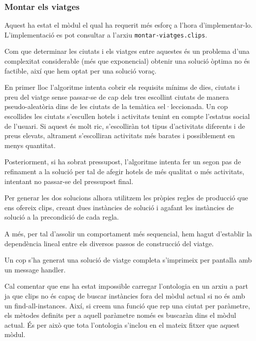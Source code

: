 \documentclass[11pt,a4paper]{article}
\begin{document}
\subsubsection*{Montar els viatges}

Aquest ha estat el mòdul el qual ha requerit més esforç a l'hora d'implementar-lo. L'implementació es pot consultar a l'arxiu \texttt{montar-viatges.clips}.

Com que determinar les ciutats i els viatges entre aquestes és un problema d'una complexitat considerable (més que exponencial) obtenir una solució òptima no és factible, així que hem optat per una solució voraç.

En primer lloc l'algoritme intenta cobrir els requisits mínims de dies, ciutats i preu del viatge sense passar-se de cap dels tres escollint ciutats de manera pseudo-aleatòria dins de les ciutats de la temàtica sel·leccionada. Un cop escollides les ciutats s'escullen hotels i activitats tenint en compte l'estatus social de l'usuari. Si aquest és molt ric, s'escolliràn tot tipus d'activitats diferents i de preus elevats, altrament s'escolliran activitats més barates i possiblement en menys quantitat.

Posteriorment, si ha sobrat pressupost, l'algoritme intenta fer un segon pas de refinament a la solució per tal de afegir hotels de més qualitat o més activitats, intentant no passar-se del pressupost final.

Per generar les dos solucions alhora utilitzem les pròpies regles de producció que ens ofereix clips, creant dues instàncies de solució i agafant les instàncies de solució a la precondició de cada regla.

A més, per tal d'assolir un comportament més sequencial, hem hagut d'establir la dependència lineal entre els diversos passos de construcció del viatge. 

Un cop s'ha generat una solució de viatge completa s'imprimeix per pantalla amb un message handler.

Cal comentar que ens ha estat impossible carregar l'ontologia en un arxiu a part ja que clips no és capaç de buscar instàncies fora del mòdul actual si no és amb un find-all-instances. Així, si creem una funció que rep una ciutat per paràmetre, els mètodes definits per a aquell paràmetre només es buscaràn dins el mòdul actual. És per això que tota l'ontologia s'inclou en el mateix fitxer que aquest mòdul.
\end{document}
